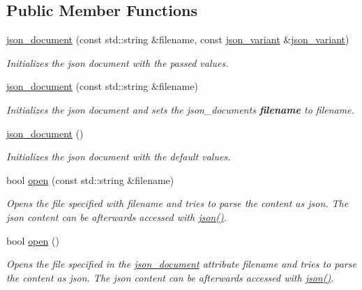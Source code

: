 \subsection*{Public Member Functions}
\begin{DoxyCompactItemize}
\item 
\hyperlink{classJSONLIB__NAMESPACE_1_1json__document_abf4e22f3453ec9856f58a202dae0c836}{json\+\_\+document} (const std\+::string \&filename, const \hyperlink{classJSONLIB__NAMESPACE_1_1json__variant}{json\+\_\+variant} \&\hyperlink{classJSONLIB__NAMESPACE_1_1json__variant}{json\+\_\+variant})
\begin{DoxyCompactList}\small\item\em Initializes the json document with the passed values. \end{DoxyCompactList}\item 
\hyperlink{classJSONLIB__NAMESPACE_1_1json__document_a3295c12f7251f1df5dc5f727a4e5b597}{json\+\_\+document} (const std\+::string \&filename)
\begin{DoxyCompactList}\small\item\em Initializes the json document and sets the json\+\_\+documents {\bfseries filename} to {\ttfamily filename}. \end{DoxyCompactList}\item 
\hyperlink{classJSONLIB__NAMESPACE_1_1json__document_acf256862749f93052ab0a5ad54272c3e}{json\+\_\+document} ()
\begin{DoxyCompactList}\small\item\em Initializes the json document with the default values. \end{DoxyCompactList}\item 
bool \hyperlink{classJSONLIB__NAMESPACE_1_1json__document_a20dc761125ccf91f7747f28a7c356be7}{open} (const std\+::string \&filename)
\begin{DoxyCompactList}\small\item\em Opens the file specified with {\ttfamily filename} and tries to parse the content as json. The json content can be afterwards accessed with \hyperlink{classJSONLIB__NAMESPACE_1_1json__document_ad87b8e7d68ba854dbd730758273a3b93}{json()}. \end{DoxyCompactList}\item 
bool \hyperlink{classJSONLIB__NAMESPACE_1_1json__document_a08e509059e628742f35716dddce2d740}{open} ()
\begin{DoxyCompactList}\small\item\em Opens the file specified in the \hyperlink{classJSONLIB__NAMESPACE_1_1json__document}{json\+\_\+document} attribute {\ttfamily filename} and tries to parse the content as json. The json content can be afterwards accessed with \hyperlink{classJSONLIB__NAMESPACE_1_1json__document_ad87b8e7d68ba854dbd730758273a3b93}{json()}. \end{DoxyCompactList}\item 

\end{DoxyCompactItemize}
